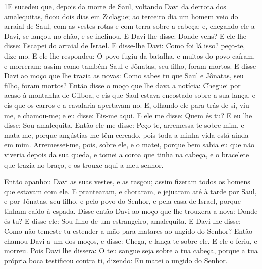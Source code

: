 
\lettrine{1} E sucedeu que, depois da morte de Saul, voltando
Davi da derrota dos amalequitas, ficou dois dias em Ziclague; ao
terceiro dia um homem veio do arraial de Saul, com as vestes rotas e
com terra sobre a cabeça; e, chegando ele a Davi, se lançou no chão,
e se inclinou. E Davi lhe disse: Donde vens? E ele lhe disse:
Escapei do arraial de Israel. E disse-lhe Davi: Como foi lá
isso? peço-te, dize-mo. E ele lhe respondeu: O povo fugiu da
batalha, e muitos do povo caíram, e morreram; assim como também Saul
e Jônatas, seu filho, foram mortos. E disse Davi ao moço que lhe
trazia as novas: Como sabes tu que Saul e Jônatas, seu filho, foram
mortos? Então disse o moço que lhe dava a notícia: Cheguei por
acaso à montanha de Gilboa, e eis que Saul estava encostado sobre a
sua lança, e eis que os carros e a cavalaria apertavam-no. E,
olhando ele para trás de si, viu-me, e chamou-me; e eu disse: Eis-me
aqui. E ele me disse: Quem és tu? E eu lhe disse: Sou
amalequita. Então ele me disse: Peço-te, arremessa-te sobre mim,
e mata-me, porque angústias me têm cercado, pois toda a minha vida
está ainda em mim. Arremessei-me, pois, sobre ele, e o matei,
porque bem sabia eu que não viveria depois da sua queda, e tomei a
coroa que tinha na cabeça, e o bracelete que trazia no braço, e os
trouxe aqui a meu senhor.

Então apanhou Davi as suas vestes, e as rasgou; assim fizeram
todos os homens que estavam com ele. E prantearam, e
choraram, e jejuaram até à tarde por Saul, e por Jônatas, seu filho,
e pelo povo do Senhor, e pela casa de Israel, porque tinham caído à
espada. Disse então Davi ao moço que lhe trouxera a nova:
Donde és tu? E disse ele: Sou filho de um estrangeiro, amalequita.
E Davi lhe disse: Como não temeste tu estender a mão para
matares ao ungido do Senhor? Então chamou Davi a um dos
moços, e disse: Chega, e lança-te sobre ele. E ele o feriu, e
morreu. Pois Davi lhe dissera: O teu sangue seja sobre a tua
cabeça, porque a tua própria boca testificou contra ti, dizendo: Eu
matei o ungido do Senhor.

